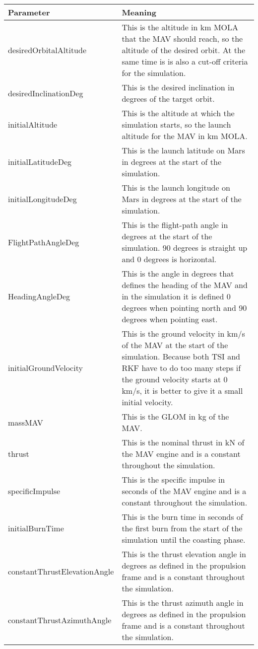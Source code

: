 \begin{longtable}{|l|p{10cm}|}
\textbf{Parameter} & \textbf{Meaning} \\ \hline 
desiredOrbitalAltitude & This is the altitude in km \ac{MOLA} that the \ac{MAV} should reach, so the altitude of the desired orbit. At the same time is is also a cut-off criteria for the simulation.  \\ \hline
desiredInclinationDeg & This is the desired inclination in degrees of the target orbit. \\ \hline
initialAltitude & This is the altitude at which the simulation starts, so the launch altitude for the \ac{MAV} in km \ac{MOLA}. \\ \hline
initialLatitudeDeg & This is the launch latitude on Mars in degrees at the start of the simulation. \\ \hline
initialLongitudeDeg & This is the launch longitude on Mars in degrees at the start of the simulation. \\ \hline
FlightPathAngleDeg & This is the flight-path angle in degrees at the start of the simulation. 90 degrees is straight up and 0 degrees is horizontal. \\ \hline
HeadingAngleDeg & This is the angle in degrees that defines the heading of the \ac{MAV} and in the simulation it is defined 0 degrees when pointing north and 90 degrees when pointing east. \\ \hline
initialGroundVelocity & This is the ground velocity in km/s of the \ac{MAV} at the start of the simulation. Because both \ac{TSI} and \ac{RKF} have to do too many steps if the ground velocity starts at 0 km/s, it is better to give it a small initial velocity.\\ \hline
massMAV & This is the \ac{GLOM} in kg of the \ac{MAV}.\\ \hline
thrust & This is the nominal thrust in kN of the \ac{MAV} engine and is a constant throughout the simulation.\\ \hline
specificImpulse & This is the specific impulse in seconds of the \ac{MAV} engine and is a constant throughout the simulation. \\ \hline
initialBurnTime & This is the burn time in seconds of the first burn from the start of the simulation until the coasting phase.\\ \hline
constantThrustElevationAngle & This is the thrust elevation angle in degrees as defined in the propulsion frame and is a constant throughout the simulation. \\ \hline
constantThrustAzimuthAngle & This is the thrust azimuth angle in degrees as defined in the propulsion frame and is a constant throughout the simulation. \\ \hline

\end{longtable}
